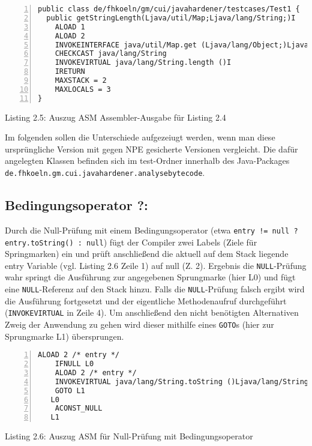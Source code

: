 \vspace{0.3cm}


\begin{lstlisting}[basicstyle=\ttfamily,numbers=left,numberstyle=\footnotesize\ttfamily,backgroundcolor=\color{source}]
public class de/fhkoeln/gm/cui/javahardener/testcases/Test1 {
  public getStringLength(Ljava/util/Map;Ljava/lang/String;)I
    ALOAD 1
    ALOAD 2
    INVOKEINTERFACE java/util/Map.get (Ljava/lang/Object;)Ljava/lang/Object;
    CHECKCAST java/lang/String
    INVOKEVIRTUAL java/lang/String.length ()I
    IRETURN
    MAXSTACK = 2
    MAXLOCALS = 3
}
\end{lstlisting}
\centerline{Listing 2.5: Auszug ASM Assembler-Ausgabe für Listing 2.4}

\vspace{0.3cm}


Im folgenden sollen die Unterschiede aufgezeiugt werden, wenn man diese ursprüngliche
Version mit gegen NPE gesicherte Versionen vergleicht. Die dafür angelegten Klassen
befinden sich im test-Ordner innerhalb des Java-Packages
\texttt{de.fhkoeln.gm.cui.javahardener.analysebytecode}.

\subsection{Bedingungsoperator ?:}

Durch die Null-Prüfung mit einem Bedingungsoperator
(etwa \texttt{entry != null ? entry.toString() : null})
fügt der Compiler zwei Labels (Ziele für Springmarken) ein und prüft
anschließend die aktuell auf dem Stack liegende entry Variable (vgl. Listing 2.6 Zeile 1)
auf null (Z. 2). Ergebnis die \texttt{NULL}-Prüfung wahr springt die Ausführung
zur angegebenen Sprungmarke (hier L0) und fügt eine \texttt{NULL}-Referenz auf den Stack hinzu.
Falls die \texttt{NULL}-Prüfung falsch ergibt wird die Ausführung fortgesetzt
und der eigentliche Methodenaufruf durchgeführt (\texttt{INVOKEVIRTUAL} in Zeile 4).
Um anschließend den nicht benötigten Alternativen Zweig der Anwendung zu gehen wird
dieser mithilfe eines \texttt{GOTO}s (hier zur Sprungmarke L1) übersprungen.

\begin{lstlisting}[basicstyle=\ttfamily,numbers=left,numberstyle=\footnotesize\ttfamily,backgroundcolor=\color{source}]
    ALOAD 2 /* entry */
    IFNULL L0
    ALOAD 2 /* entry */
    INVOKEVIRTUAL java/lang/String.toString ()Ljava/lang/String;
    GOTO L1
   L0
    ACONST_NULL
   L1
\end{lstlisting}
\centerline{Listing 2.6: Auszug ASM für Null-Prüfung mit Bedingungsoperator}

